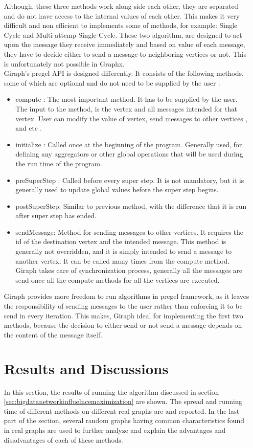 \documentclass[english]{tktltiki}
\begin{document}
Although, these three methods work along side each other, they are separated and do not have access to the internal values of each other. This makes it very difficult and non efficient to implements some of methods, for example: Single Cycle and Multi-attemp Single Cycle. These two algorithm, are designed to act upon the message they receive immediately and based on value of each message, they have to decide either to send a message to neighboring vertices or not. This is unfortunately not possible in Graphx. \\
Giraph's pregel API is designed differently. It consists of the following methods, some of which are optional and do not need to be supplied by the user :
\begin{itemize}
\item compute : The most important method. It has to be supplied by the user. The input to the method, is the vertex and all messages intended for that vertex. User can modify the value of vertex, send messages to other vertices , and etc .
\item initialize : Called once at the beginning of the program. Generally used, for defining any aggregators or other global operations that will be used during the run time of the program.
\item preSuperStep : Called before every super step. It is not mandatory, but it is generally used to update global values before the super step begins.
\item postSuperStep: Similar to previous method, with the difference that it is run after super step has ended.
\item sendMessage: Method for sending messages to other vertices. It requires the id of the destination vertex and the intended message. This method is generally not overridden, and it is simply intended to send a message to another vertex. It can be called many times from the compute method. Giraph takes care of synchronization process, generally all the messages are send once all the compute methods for all the vertices are executed.
\end{itemize}

Giraph provides more freedom to run algorithms in pregel framework, as it leaves the responsibility of sending messages to the user rather than enforcing it to be send in every iteration. This makes, Giraph ideal for implementing the first two methods, because the decision to either send or not send a message depends on the content of the message itself.


\section{Results and Discussions}
In this section, the results of running the algorithm discussed in section \ref{sec:bigdatanetworkinfluelncemaximization} are shown. The spread and running time of different methods on different real graphs are and reported. In the last part of the section, several random graphs having common characteristics found in real graphs are used to further analyze and explain the advantages and disadvantages of each of these methods.
\end{document}
